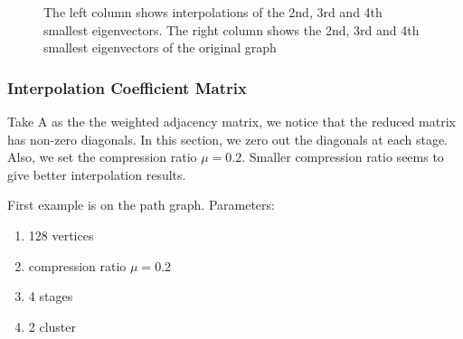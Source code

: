 \documentclass[a4paper]{article}
\begin{document}
\begin{figure}[H]
\caption{The left column shows interpolations of the 2nd, 3rd and 4th smallest eigenvectors. The right column shows the 2nd, 3rd and 4th smallest eigenvectors of the original graph}


\end{figure}

\subsubsection{Interpolation Coefficient Matrix}
Take A as the the weighted adjacency matrix, we notice that the reduced matrix has non-zero diagonals. In this section, we zero out the diagonals at each stage. Also, we set the compression ratio $\mu = 0.2$. Smaller compression ratio seems to give better interpolation results.

First example is on the path graph. Parameters:
\begin{enumerate}
\item 128 vertices
\item compression ratio $\mu = 0.2$
\item 4 stages
\item 2 cluster
\end{enumerate}
\end{document}
